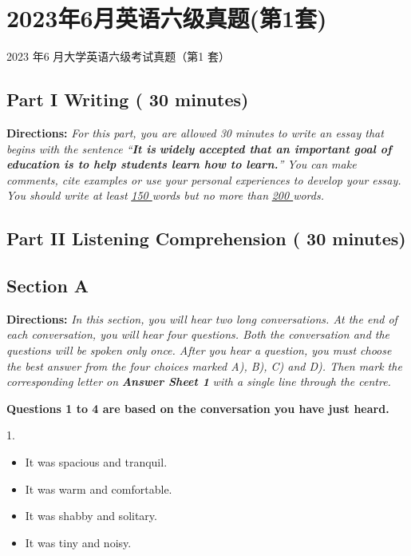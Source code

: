 \documentclass[UTF8,11pt]{ctexart}
\begin{document}
\section*{2023年6月英语六级真题(第1套)}
2023 年6 月大学英语六级考试真题（第1 套）


\subsection*{\textbf{Part I Writing} \textbf{( 30 minutes)}}


\textbf{Directions:}\textit{ For this part, you are allowed 30 minutes to write an essay that begins with the sentence “}\textbf{\textit{It is}} \textbf{\textit{widely accepted that an important goal of education is to help students learn how to learn.}}\textit{” You can make} \textit{comments, cite examples or use your personal experiences to develop your essay. You should write at least} \textit{\uline{150 }}\textit{words but no more than }\textit{\uline{200 }}\textit{words.}


\subsection*{\textbf{Part II} \textbf{Listening Comprehension} \textbf{( 30 minutes)}}


\subsection*{\textbf{Section A}}


\textbf{Directions:} \textit{In this section, you will hear two long conversations. At the end of each conversation, you will} \textit{hear four questions. Both the conversation and the questions will be spoken only once. After you hear a} \textit{question, you must choose the best answer from the four choices marked A), B), C) and D). Then mark the} \textit{corresponding letter on }\textbf{\textit{Answer Sheet 1}}\textit{ with a single line through the centre.}


\textbf{Questions 1 to 4 are based on the conversation you have just heard.}


1.


\begin{itemize}[leftmargin=2em,itemsep=.2em,topsep=.4em]\item[A.] It was spacious and tranquil.
\item[B.] It was warm and comfortable.
\item[C.] It was shabby and solitary.
\item[D.] It was tiny and noisy.
\end{itemize}
\end{document}
